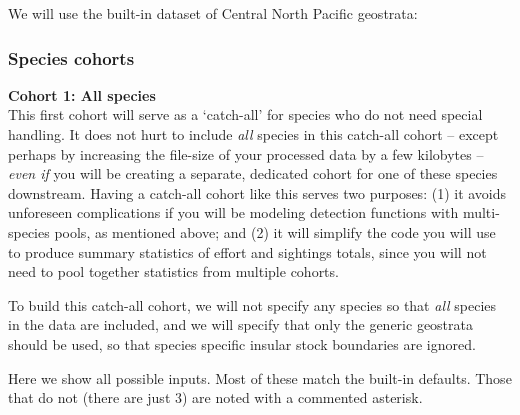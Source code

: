 \documentclass[
]{book}
\newenvironment{Shaded}{\begin{snugshade}}{\end{snugshade}}
\newcommand{\DecValTok}[1]{\textcolor[rgb]{0.00,0.00,0.81}{#1}}
\newcommand{\KeywordTok}[1]{\textcolor[rgb]{0.13,0.29,0.53}{\textbf{#1}}}
\newcommand{\NormalTok}[1]{#1}
\newcommand{\OperatorTok}[1]{\textcolor[rgb]{0.81,0.36,0.00}{\textbf{#1}}}
\newcommand{\StringTok}[1]{\textcolor[rgb]{0.31,0.60,0.02}{#1}}
\begin{document}
We will use the built-in dataset of Central North Pacific geostrata:

\begin{Shaded}
\end{Shaded}

\hypertarget{species-cohorts}{%
\subsubsection*{Species cohorts}\label{species-cohorts}}

\textbf{Cohort 1: All species}\\
This first cohort will serve as a `catch-all' for species who do not need special handling. It does not hurt to include \emph{all} species in this catch-all cohort -- except perhaps by increasing the file-size of your processed data by a few kilobytes -- \emph{even if} you will be creating a separate, dedicated cohort for one of these species downstream. Having a catch-all cohort like this serves two purposes: (1) it avoids unforeseen complications if you will be modeling detection functions with multi-species pools, as mentioned above; and (2) it will simplify the code you will use to produce summary statistics of effort and sightings totals, since you will not need to pool together statistics from multiple cohorts.

To build this catch-all cohort, we will not specify any species so that \emph{all} species in the data are included, and we will specify that only the generic geostrata should be used, so that species specific insular stock boundaries are ignored.

Here we show all possible inputs. Most of these match the built-in defaults. Those that do not (there are just 3) are noted with a commented asterisk.
\end{document}
